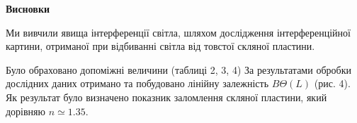 \begin{center}
    \Large{\textbf{Висновки}}    
\end{center}

\vspace{1mm}

Ми вивчили 
явища інтерференції світла, шляхом дослідження інтерференційної картини,
отриманої при відбиванні світла від товстої скляної пластини.

Було обраховано допоміжні величини (таблиці 2, 3, 4)
За результатами обробки дослідних даних отримано та побудовано лінійну залежність $B \Theta(L)$ (рис. 4).
Як результат було визначено показник заломлення скляної пластини, який дорівняю $n \simeq 1.35$.

